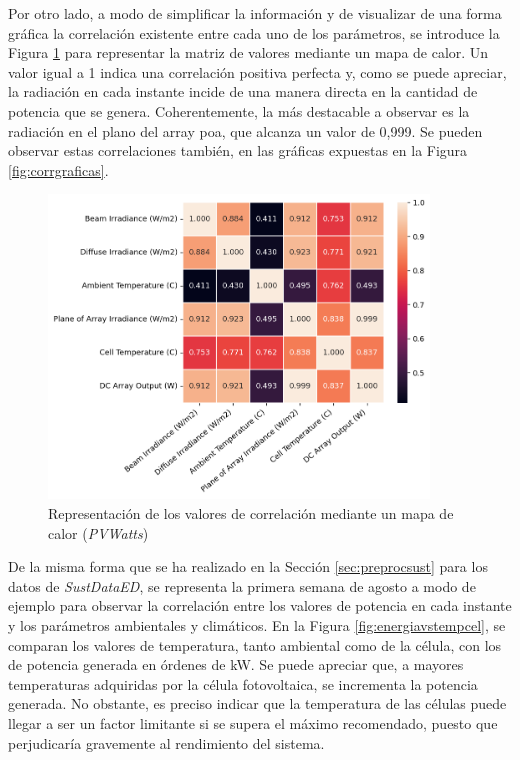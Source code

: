 \vspace{3mm}

Por otro lado, a modo de simplificar la información y de visualizar de una forma gráfica la correlación existente entre cada uno de los parámetros, se introduce la Figura \ref{fig:corr} para representar la matriz de valores mediante un mapa de calor. Un valor igual a 1 indica una correlación positiva perfecta y, como se puede apreciar, la radiación en cada instante incide de una manera directa en la cantidad de potencia que se genera. Coherentemente, la más destacable a observar es la radiación en el plano del array \gls{poa}, que alcanza un valor de 0,999. Se pueden observar estas correlaciones también, en las gráficas expuestas en la Figura \ref{fig:corrgraficas}.

\vspace{3mm}

\begin{figure}[H]
  \centering
  \includegraphics[width=0.9\textwidth]{img/diseno/corr.png}
  \caption{Representación de los valores de correlación mediante un mapa de calor (\textit{PVWatts})}
  \label{fig:corr}
\end{figure}

De la misma forma que se ha realizado en la Sección \ref{sec:preprocsust} para los datos de \textit{SustDataED}, se representa la primera semana de agosto a modo de ejemplo para observar la correlación entre los valores de potencia en cada instante y los parámetros ambientales y climáticos. En la Figura \ref{fig:energiavstempcel}, se comparan los valores de temperatura, tanto ambiental como de la célula, con los de potencia generada en órdenes de kW. Se puede apreciar que, a mayores temperaturas adquiridas por la célula fotovoltaica, se incrementa la potencia generada. No obstante, es preciso indicar que la temperatura de las células puede llegar a ser un factor limitante si se supera el máximo recomendado, puesto que perjudicaría gravemente al rendimiento del sistema.

